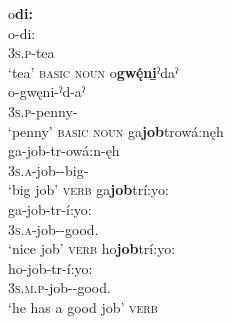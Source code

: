 \ea\label{ex:loann4}
\ea o\textbf{di:}\\\label{ex:loann4a}
\gll o-di:\\
\textsc{3s.p}-tea\\
\glt `tea' \textsc{basic noun}
\ex o\textbf{gwę́ni̱}ˀdaˀ\\\label{ex:loann4b}
\gll o-gwęni-ˀd-aˀ\\
\textsc{3s.p}-penny-\\
\glt `penny' \textsc{basic noun}
\ex ga\textbf{job}trowá:nęh\\\label{ex:loann4c}
\gll ga-job-tr-owá:n-ęh\\
 \textsc{3s.a}-job-{\nominalizer}-big-{\stative}\\
\glt `big job' \textsc{verb}
\ex ga\textbf{job}trí:yo:\\\label{ex:loann4d}
\gll ga-job-tr-í:yo:\\
 \textsc{3s.a}-job-{\nominalizer}-good.{\stative}\\
\glt `nice job' \textsc{verb}
\ex ho\textbf{job}trí:yo:\\\label{ex:loann4e}
\gll ho-job-tr-í:yo:\\
 \textsc{3s.m.p}-job-{\nominalizer}-good.{\stative}\\
\glt `he has a good job' \textsc{verb}
\z
\z



